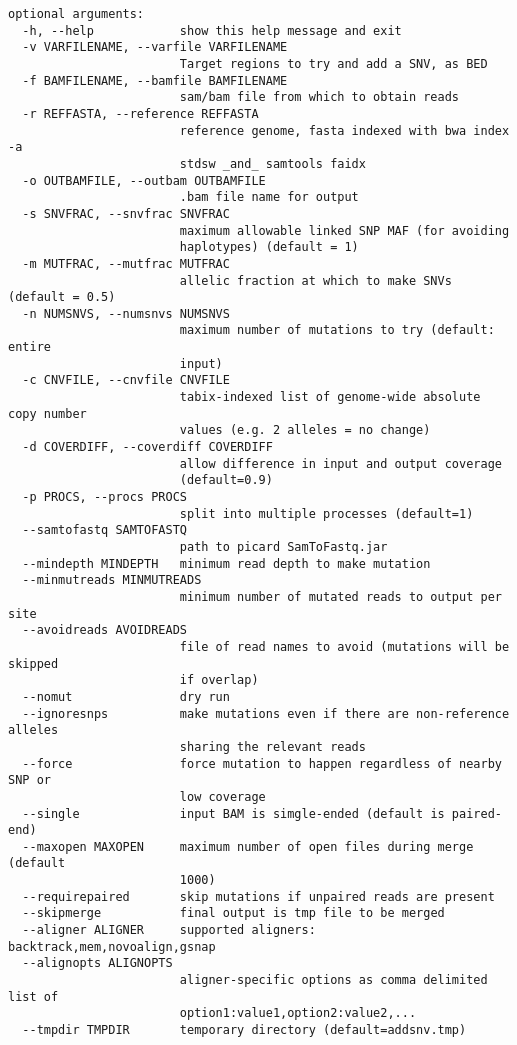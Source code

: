 \documentclass[letterpaper,11pt]{article}
\begin{document}
\begin{verbatim}
optional arguments:
  -h, --help            show this help message and exit
  -v VARFILENAME, --varfile VARFILENAME
                        Target regions to try and add a SNV, as BED
  -f BAMFILENAME, --bamfile BAMFILENAME
                        sam/bam file from which to obtain reads
  -r REFFASTA, --reference REFFASTA
                        reference genome, fasta indexed with bwa index -a
                        stdsw _and_ samtools faidx
  -o OUTBAMFILE, --outbam OUTBAMFILE
                        .bam file name for output
  -s SNVFRAC, --snvfrac SNVFRAC
                        maximum allowable linked SNP MAF (for avoiding
                        haplotypes) (default = 1)
  -m MUTFRAC, --mutfrac MUTFRAC
                        allelic fraction at which to make SNVs (default = 0.5)
  -n NUMSNVS, --numsnvs NUMSNVS
                        maximum number of mutations to try (default: entire
                        input)
  -c CNVFILE, --cnvfile CNVFILE
                        tabix-indexed list of genome-wide absolute copy number
                        values (e.g. 2 alleles = no change)
  -d COVERDIFF, --coverdiff COVERDIFF
                        allow difference in input and output coverage
                        (default=0.9)
  -p PROCS, --procs PROCS
                        split into multiple processes (default=1)
  --samtofastq SAMTOFASTQ
                        path to picard SamToFastq.jar
  --mindepth MINDEPTH   minimum read depth to make mutation
  --minmutreads MINMUTREADS
                        minimum number of mutated reads to output per site
  --avoidreads AVOIDREADS
                        file of read names to avoid (mutations will be skipped
                        if overlap)
  --nomut               dry run
  --ignoresnps          make mutations even if there are non-reference alleles
                        sharing the relevant reads
  --force               force mutation to happen regardless of nearby SNP or
                        low coverage
  --single              input BAM is simgle-ended (default is paired-end)
  --maxopen MAXOPEN     maximum number of open files during merge (default
                        1000)
  --requirepaired       skip mutations if unpaired reads are present
  --skipmerge           final output is tmp file to be merged
  --aligner ALIGNER     supported aligners: backtrack,mem,novoalign,gsnap
  --alignopts ALIGNOPTS
                        aligner-specific options as comma delimited list of
                        option1:value1,option2:value2,...
  --tmpdir TMPDIR       temporary directory (default=addsnv.tmp)
\end{verbatim}
\end{document}
